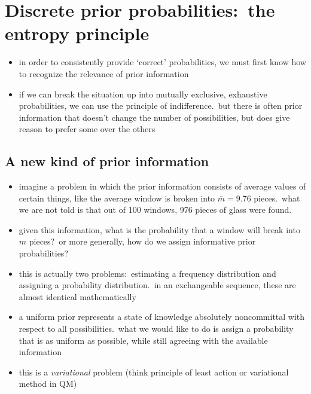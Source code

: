 \documentclass[../jaynes_prob_theory_notes.tex]{subfiles}
\begin{document}
    \section{Discrete prior probabilities:\ the entropy principle}
        \begin{itemize} 
            \item in order to consistently provide `correct' probabilities, we must first know how to recognize the relevance of prior information
            \item if we can break the situation up into mutually exclusive, exhaustive probabilities, we can use the principle of indifference.\ but there is often prior information that doesn't change the number of possibilities, but does give reason to prefer some over the others
        \end{itemize}

        \subsection{A new kind of prior information}
            \begin{itemize} 
                \item imagine a problem in which the prior information consists of average values of certain things, like the average window is broken into $\overline{m} = 9.76$ pieces.\ what we are not told is that out of 100 windows, 976 pieces of glass were found.
                \item given this information, what is the probability that a window will break into $m$ pieces?\ or more generally, how do we assign informative prior probabilities?
                \item this is actually two problems:\ estimating a frequency distribution and assigning a probability  distribution.\ in an exchangeable sequence, these are almost identical mathematically
                \item a uniform prior represents a state of knowledge absolutely noncommittal with respect to all possibilities.\ what we would like to do is assign a probability that is as uniform as possible, while still agreeing with the available information
                \item this is a \textit{variational} problem (think principle of least action or variational method in QM)
            \end{itemize}
\end{document}
